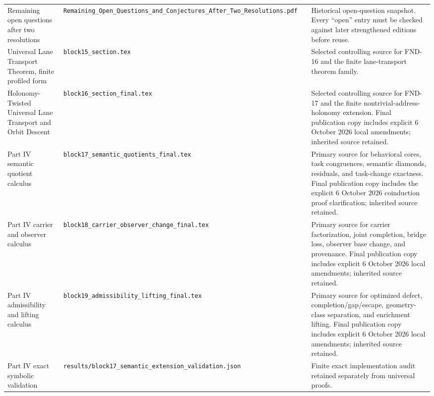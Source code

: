 \begin{longtable}{@{}L{0.18\textwidth}L{0.22\textwidth}L{0.25\textwidth}L{0.29\textwidth}@{}}
Remaining open questions after two resolutions & \nolinkurl{Remaining_Open_Questions_and_Conjectures_After_Two_Resolutions.pdf} & \texttt{} & Historical open-question snapshot. Every ``open'' entry must be checked against later strengthened editions before reuse.\\[3pt]
Universal Lane Transport Theorem, finite profiled form & \nolinkurl{block15_section.tex} & \texttt{} & Selected controlling source for FND-16 and the finite lane-transport theorem family.\\[3pt]
Holonomy-Twisted Universal Lane Transport and Orbit Descent & \nolinkurl{block16_section_final.tex} & \texttt{} & Selected controlling source for FND-17 and the finite nontrivial-address-holonomy extension. Final publication copy includes explicit 6 October 2026 local amendments; inherited source retained.\\[3pt]
Part IV semantic quotient calculus & \nolinkurl{block17_semantic_quotients_final.tex} & \texttt{} & Primary source for behavioral cores, task congruences, semantic diamonds, residuals, and task-change exactness. Final publication copy includes the explicit 6 October 2026 coinduction proof clarification; inherited source retained.\\[3pt]
Part IV carrier and observer calculus & \nolinkurl{block18_carrier_observer_change_final.tex} & \texttt{} & Primary source for carrier factorization, joint completion, bridge loss, observer base change, and provenance. Final publication copy includes explicit 6 October 2026 local amendments; inherited source retained.\\[3pt]
Part IV admissibility and lifting calculus & \nolinkurl{block19_admissibility_lifting_final.tex} & \texttt{} & Primary source for optimized defect, completion/gap/escape, geometry-class separation, and enrichment lifting. Final publication copy includes explicit 6 October 2026 local amendments; inherited source retained.\\[3pt]
Part IV exact symbolic validation & \nolinkurl{results/block17_semantic_extension_validation.json} & \texttt{} & Finite exact implementation audit retained separately from universal proofs.\\[3pt]
\end{longtable}
\endgroup
